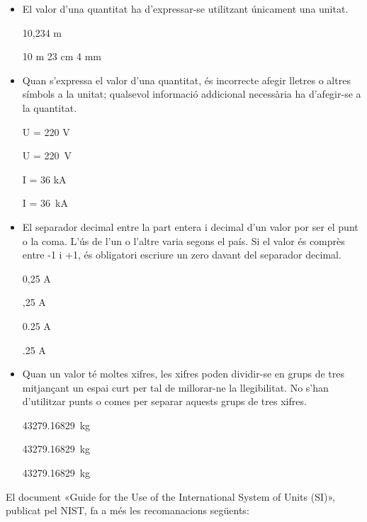 \begin{itemize}
\textcolor{Red}\faTimesCircle{}   \SI{20}{\ohm.m} són 20 ohm multiplicat per metre


\item El valor d'una quantitat ha d'expressar-se  utilitzant únicament una
unitat.

\textcolor{Green}\faCheckSquare{} 10,234 m

\textcolor{Red}\faTimesCircle{}  10 m 23 cm 4 mm


\item Quan s'expressa el valor d'una quantitat, és incorrecte afegir
lletres o altres símbols a la unitat; qualsevol informació
addicional necessària ha d'afegir-se a la quantitat.

\textcolor{Green}\faCheckSquare{} U = 220 V

\textcolor{Red}\faTimesCircle{}  U = \SI{220}{V}

\textcolor{Green}\faCheckSquare{}  I = 36 kA

\textcolor{Red}\faTimesCircle{}   I = \SI{36}{kA}


\item El separador decimal entre la part entera i decimal d'un valor por ser el punt o la coma. L'ús de l'un o l'altre varia segons el país. Si el valor és comprès entre -1 i +1, és obligatori escriure un zero davant del separador decimal.

\textcolor{Green}\faCheckSquare{} 0,25 A

\textcolor{Red}\faTimesCircle{}  ,25 A

\textcolor{Green}\faCheckSquare{} 0.25 A

\textcolor{Red}\faTimesCircle{}  .25 A


\item Quan un valor té moltes xifres, les xifres poden dividir-se en grups de tres mitjançant un espai curt per tal de millorar-ne la llegibilitat. No s'han d'utilitzar punts o comes per separar aquests grups de tres xifres.

\textcolor{Green}\faCheckSquare{} \SI{43279,16829}{kg}

\textcolor{Green}\faCheckSquare{} \SI[group-separator =]{43279,16829}{kg}

\textcolor{Red}\faTimesCircle{}  \SI[group-separator = .]{43279,16829}{kg}

\end{itemize}

El document  «Guide for the Use of the International System of Units (SI)», publicat pel NIST,  fa a més les recomanacions següents:

